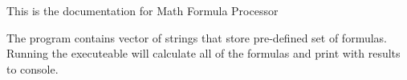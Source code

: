 This is the documentation for Math Formula Processor

The program contains vector of strings that store pre-\/defined set of formulas. Running the executeable will calculate all of the formulas and print with results to console. 